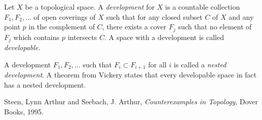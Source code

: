 \documentclass[12pt]{article}
\newcommand{\<}{\langle}
\renewcommand{\>}{\rangle}
\begin{document}
Let $X$ be a topological space.  A \emph{development} for $X$ is a countable collection $F_1, F_2, \ldots$ of open coverings of $X$ such that for any closed subset $C$ of $X$ and any point $p$ in the complement of $C$, there exists a cover $F_j$ such that no element of $F_j$ which contains $p$ intersects $C$.  A space with a development is called \emph{developable}.

A development $F_1, F_2,\ldots$ such that $F_i\subset F_{i+1}$ for all $i$ is called a \emph{nested development}.  A theorem from Vickery states that every developable space in fact has a nested development.

\begin{thebibliography}{9}
Steen, Lynn Arthur and Seebach, J. Arthur, \emph{Counterexamples in Topology}, Dover Books, 1995.
\end{thebibliography}
\end{document}
